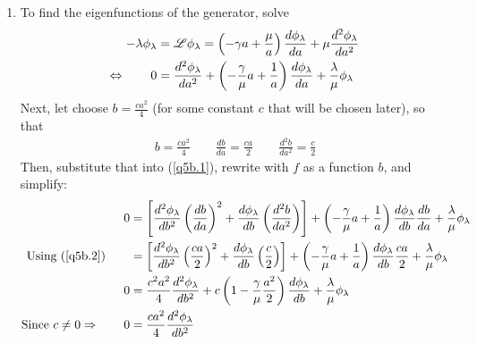 \documentclass[12pt]{article}
\theoremstyle{plain}
\theoremstyle{definition}
\theoremstyle{remark}
\begin{document}
\begin{enumerate}
\begin{enumerate}
      \item %
        To find the eigenfunctions of the generator, solve
        \begin{align}
          -\lambda \phi_\lambda
          &= \mathscr{L}\phi_\lambda
          =
           \left(-\gamma a + \frac{\mu}{a}\right) \frac{d\phi_\lambda}{da}
            + \mu \frac{d^2\phi_\lambda}{d a^2} \notag \\
          \Leftrightarrow \qquad
          0 &=
            \frac{d^2\phi_\lambda}{da^2} +
           \left(-\frac{\gamma}{\mu} a + \frac{1}{a}\right) \frac{d\phi_\lambda}{da}
            + \frac{\lambda}{\mu} \phi_\lambda
            \label{q5b.1}
        \end{align}
        Next, let choose $b = \frac{ca^2}{4}$ (for some constant $c$
        that will be chosen later), so that
        \begin{align}
          b = \frac{c a^2}{4}
          \qquad
          \frac{db}{da} = \frac{ca}{2}
          \qquad
          \frac{d^2b}{da^2} = \frac{c}{2}
          \label{q5b.2}
        \end{align}
        Then, substitute that into (\ref{q5b.1}), rewrite with $f$ as
        a function $b$, and simplify:
        \begin{align*}
          0 &=
          \left[
            \frac{d^2 \phi_\lambda}{d b^2}\left(\frac{db}{da}\right)^2
            +\frac{d \phi_\lambda}{d b}\left(\frac{d^2b}{da^2}\right)
            \right]+
           \left(
           -\frac{\gamma}{\mu} a + \frac{1}{a}
           \right)
           \frac{d \phi_\lambda}{d b}
           \frac{d b}{d a}
            + \frac{\lambda}{\mu} \phi_\lambda\\
          \text{Using (\ref{q5b.2})}
          \qquad
          &=
          \left[
            \frac{d^2 \phi_\lambda}{d b^2}\left(\frac{ca}{2}\right)^2
            +\frac{d \phi_\lambda}{d b}\left(\frac{c}{2}\right)
            \right]+
           \left(
           -\frac{\gamma}{\mu} a + \frac{1}{a}
           \right)
           \frac{d \phi_\lambda}{d b}
           \frac{ca}{2}
            + \frac{\lambda}{\mu} \phi_\lambda\\
          0&=
            \frac{c^2a^2}{4}\frac{d^2 \phi_\lambda}{d b^2}
            +
           c\left(
           1-\frac{\gamma}{\mu} \frac{a^2}{2}
           \right)
           \frac{d \phi_\lambda}{d b}
            + \frac{\lambda}{\mu} \phi_\lambda\\
          \text{Since $c\neq 0$}\Rightarrow\qquad
          0&=
            \frac{ca^2}{4}\frac{d^2 \phi_\lambda}{d b^2}

\end{align*}
\end{enumerate}
\end{enumerate}
\end{document}
